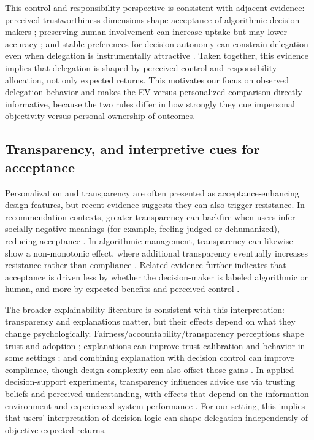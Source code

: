 \documentclass[a4paper, 12pt, fleqn]{article}
\theoremstyle{definition}
\begin{document}
This control-and-responsibility perspective is consistent with adjacent evidence: perceived trustworthiness dimensions shape acceptance of algorithmic decision-makers \citep{Hoeddinghaus2021}; preserving human involvement can increase uptake but may lower accuracy \citep{Sele2024}; and stable preferences for decision autonomy can constrain delegation even when delegation is instrumentally attractive \citep{Ivanova-Stenzel2025}. Taken together, this evidence implies that delegation is shaped by perceived control and responsibility allocation, not only expected returns. This motivates our focus on observed delegation behavior and makes the EV-versus-personalized comparison directly informative, because the two rules differ in how strongly they cue impersonal objectivity versus personal ownership of outcomes.

\subsection{Transparency, and interpretive cues for acceptance}
Personalization and transparency are often presented as acceptance-enhancing design features, but recent evidence suggests they can also trigger resistance. In recommendation contexts, greater transparency can backfire when users infer socially negative meanings (for example, feeling judged or dehumanized), reducing acceptance \citep{Chen2024}. In algorithmic management, transparency can likewise show a non-monotonic effect, where additional transparency eventually increases resistance rather than compliance \citep{Hu2024}. Related evidence further indicates that acceptance is driven less by whether the decision-maker is labeled algorithmic or human, and more by expected benefits and perceived control \citep{Schaap2024}.

The broader explainability literature is consistent with this interpretation: transparency and explanations matter, but their effects depend on what they change psychologically. Fairness/accountability/transparency perceptions shape trust and adoption \citep{Shin2019}; explanations can improve trust calibration and behavior in some settings \citep{Leichtmann2023}; and combining explanation with decision control can improve compliance, though design complexity can also offset those gains \citep{Westphal2023}. In applied decision-support experiments, transparency influences advice use via trusting beliefs and perceived understanding, with effects that depend on the information environment and experienced system performance \citep{Ning2024,Sun2026}. For our setting, this implies that users' interpretation of decision logic can shape delegation independently of objective expected returns.
\end{document}

